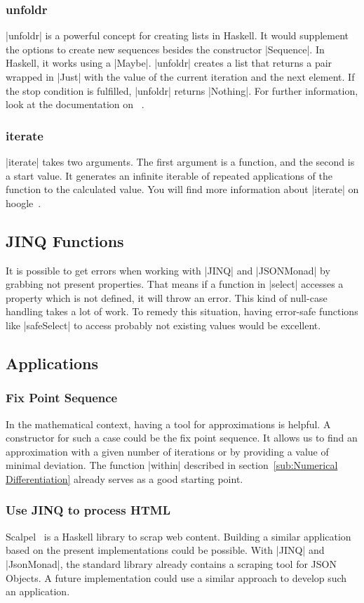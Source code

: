 \subsubsection{unfoldr}
\label{subsub:unfoldr}
|unfoldr| is a powerful concept for creating lists in Haskell. It would
supplement the options to create new sequences besides the constructor |Sequence|. 
In Haskell, it works using a |Maybe|. |unfoldr| creates a list that returns a
pair wrapped in |Just| with the value of the current iteration and the next
element. If the stop condition is fulfilled, |unfoldr| returns |Nothing|. For
further information, look at the documentation on ~\cite{hoogle_unfoldr}.

\subsubsection{iterate}
\label{subsub:iterate}
|iterate| takes two arguments. The first argument is a function, and the second
is a start value. It generates an infinite iterable of repeated applications of
the function to the calculated value. You will find more information about
|iterate| on hoogle~\cite{hoogle_iterate}.

\subsection{JINQ Functions}
\label{sub:JINQ Functions}
It is possible to get errors when working with |JINQ| and |JSONMonad| by grabbing
not present properties. That means if a function in |select| accesses a property
which is not defined, it will throw an error. This kind of null-case handling
takes a lot of work. To remedy this situation, having error-safe functions like
|safeSelect| to access probably not existing values would be excellent.

\subsection{Applications}
\label{sub:Applications}
\subsubsection{Fix Point Sequence}
\label{subsub:Fixpoint Sequence}
In the mathematical context, having a tool for approximations is helpful. A
constructor for such a case could be the fix point sequence. It allows us to
find an approximation with a given number of iterations or by providing a value
of minimal deviation. The function |within| described in 
section~\ref{sub:Numerical Differentiation} already serves as a good starting
point.

\subsubsection{Use JINQ to process HTML}
\label{subsub:Use JINQ to process HTML}
Scalpel~\cite{scalpel} is a Haskell library to scrap web content. Building a
similar application based on the present implementations could be possible.
With |JINQ| and |JsonMonad|, the standard library already contains a scraping
tool for JSON Objects. A future implementation could use a similar approach to
develop such an application.
